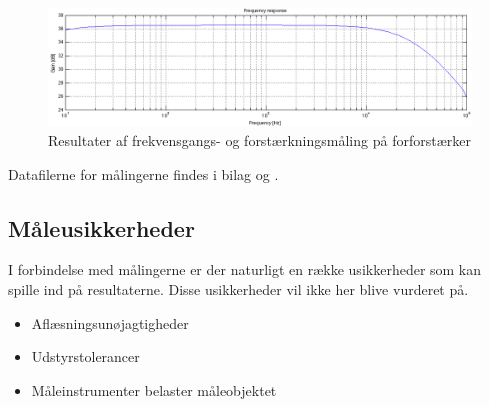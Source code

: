\begin{figure}[h]
\centering
\includegraphics[width=\textwidth]{maalerapporter/forforstaerker/frekvensrespons-forforstaerker.png}
\caption{Resultater af frekvensgangs- og forstærkningsmåling på forforstærker}
\label{fig:fresultat-forforstaerker}
\end{figure}

Datafilerne for målingerne findes i bilag \cite{forforstaerker-3.16mvInputTHDogFrekvensRespons} %
og 
\cite{forforstaerker-31.6mvInputTHDogFrekvensRespons}.%

\subsection*{Måleusikkerheder}
I forbindelse med målingerne er der naturligt en række usikkerheder som kan spille ind på resultaterne. Disse usikkerheder vil ikke her blive vurderet på. 

\begin{itemize}
\item Aflæsningsunøjagtigheder
\item Udstyrstolerancer
\item Måleinstrumenter belaster måleobjektet
\end{itemize}